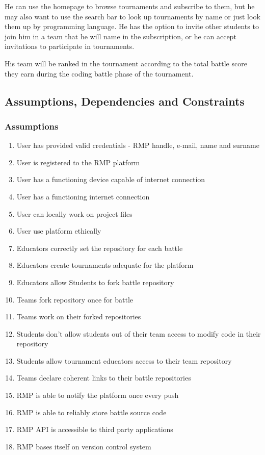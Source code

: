 He can use the homepage to browse tournaments and subscribe to them, but he may also want to use the search bar to look up tournaments by name or just look them up by programming language. He has the option to invite other students
to join him in a team that he will name in the subscription, or he can accept invitations to participate in tournaments.

His team will be ranked in the tournament according to the total battle score they earn during the coding battle phase of the tournament.

\subsection{Assumptions, Dependencies and Constraints}

\subsubsection{Assumptions}
\begin{enumerate}[label=$\bullet$ \textbf{D\arabic*:}]
    \item User has provided valid credentials - RMP handle, e-mail, name and surname
    \item User is registered to the RMP platform
    \item User has a functioning device capable of internet connection
    \item User has a functioning internet connection
    \item User can locally work on project files
    \item User use platform ethically
    \item Educators correctly set the repository for each battle
    \item Educators create tournaments adequate for the platform
    \item Educators allow Students to fork battle repository
    \item Teams fork repository once for battle
    \item Teams work on their forked repositories
    \item Students don't allow students out of their team access to modify code in their repository
    \item Students allow tournament educators access to their team repository
    \item Teams declare coherent links to their battle repositories
    \item RMP is able to notify the platform once every push
    \item RMP is able to reliably store battle source code
    \item RMP API is accessible to third party applications
    \item RMP bases itself on version control system
\end{enumerate}

